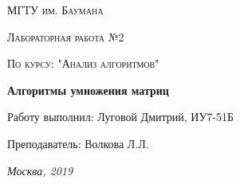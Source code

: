 \documentclass[a4paper,12pt]{report}
\begin{document}
\begin{titlepage}
	\centering
	{\scshape\LARGE МГТУ им. Баумана \par}
	\vspace{4cm}
	{\scshape\Large Лабораторная работа №2\par}
	\vspace{0.5cm}	
	{\scshape\Large По курсу: "Анализ алгоритмов"\par}
	\vspace{2cm}
	{\huge\bfseries Алгоритмы умножения матриц\par}
	\vspace{3cm}
	\Large Работу выполнил: Луговой Дмитрий, ИУ7-51Б\par
	\vspace{0.5cm}
	\Large Преподаватель:  Волкова Л.Л.\par

	\vfill
	\large \textit {Москва, 2019} \par
\end{titlepage}

\setcounter{page}{2}

\tableofcontents

\newpage
\end{document}
